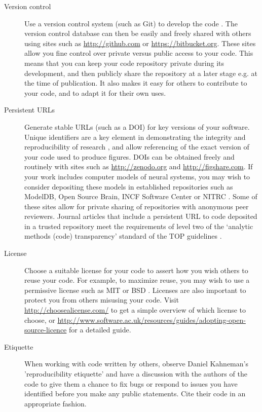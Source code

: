 \documentclass[11pt]{article}
\begin{document}
\begin{description}
\item [Version control] Use a version control system (such as Git) to
  develop the code \cite{Blischak2016}.  The version control database
  can then be easily and freely shared with others using sites such as
  \url{http://github.com} \cite{Ram2013} or
  \url{https://bitbucket.org}.  These sites allow you fine control
  over private versus public access to your code.  This means that you
  can keep your code repository private during its development, and
  then publicly share the repository at a later stage e.g. at the time
  of publication. It also makes it easy for others to contribute to
  your code, and to adapt it for their own uses.

\item [Persistent URLs] Generate stable URLs (such as a DOI) for key
  versions of your software.  Unique identifiers are a key element in
  demonstrating the integrity and reproducibility of research
  \cite{vasilevsky2013reproducibility}, and allow referencing of the 
  exact version of your code used to produce figures. DOIs can be
  obtained freely and routinely with sites such as
  \url{http://zenodo.org} and \url{http://figshare.com}.  If your work
  includes computer models of neural systems, you may wish to consider
  depositing these models in established repositories such as
  ModelDB\cite{modeldb}, Open Source Brain\cite{osb}, INCF
  Software Center\cite{web:incf-software} or NITRC
  \cite{poline_software_2014}. Some of these sites allow for private
  sharing of repositories with anonymous peer reviewers. Journal
  articles that include a persistent URL to code deposited in a
  trusted repository meet the requirements of level two of the
  `analytic methods (code) transparency' standard of the TOP
  guidelines \cite{Nosek2015}.


\item [License] Choose a suitable license for your code to assert how
  you wish others to reuse your code.  For example, to maximize reuse,
  you may wish to use a permissive license such as MIT or BSD
  \cite{stodden2009enabling}.  Licenses are also important to protect you from
  others misusing your code.  Visit \url{http://choosealicense.com/}
  to get a simple overview of which license to choose, or 
  \url{http://www.software.ac.uk/resources/guides/adopting-open-source-licence}
  for a detailed guide.

\item [Etiquette] When working with code written by others, observe
  Daniel Kahneman's 'reproducibility etiquette'\cite{Kahneman2014} and
  have a discussion with the authors of the code to give them a chance
  to fix bugs or respond to issues you have identified before you make
  any public statements.  Cite their code in an appropriate fashion.



\end{description}
\end{document}
